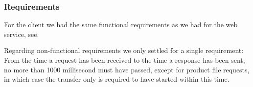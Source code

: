\subsubsection{Requirements}
For the client we had the same functional requirements as we had for the web service, see.

Regarding non-functional requirements we only settled for a single requirement: From the time a request has been received to the time a response has been sent, no more than 1000 millisecond must have passed, except for product file requests, in which case the transfer only is required to have started within this time.
